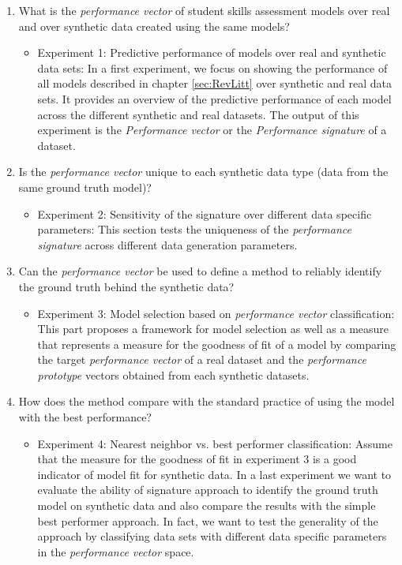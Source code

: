 \begin{enumerate}
\item What is the \textit{performance vector} of student skills assessment models over real and over synthetic data created using the same models?
\begin{itemize}
\item Experiment 1: Predictive performance of models over real and synthetic data sets: In a first experiment, we focus on showing the performance of all models described in chapter \ref{sec:RevLitt} over synthetic and real data sets. It provides an overview of the predictive performance of each model across the different synthetic and real datasets. The output of this experiment is the \textit{Performance vector} or the \textit{Performance signature} of a dataset.
\end{itemize}
\item Is the \textit{performance vector} unique to each synthetic data type (data from the same ground truth model)?
\begin{itemize}
\item Experiment 2: Sensitivity of the signature over different data specific parameters: This section tests the uniqueness of the \textit{performance signature} across different data generation parameters.
\end{itemize}
\item Can the \textit{performance vector} be used to define a method to reliably identify the ground truth behind the synthetic data?
\begin{itemize}
\item Experiment 3: Model selection based on \textit{performance vector} classification: This part proposes a framework for model selection as well as a measure that represents a measure for the goodness of fit of a model by comparing the target \textit{performance vector} of a real dataset and the \textit{performance prototype} vectors obtained from each synthetic datasets.
\end{itemize}
\item How does the method compare with the standard practice of using the model with the best performance?
\begin{itemize}

\item Experiment 4: Nearest neighbor vs. best performer classification: Assume that the measure for the goodness of fit in experiment 3 is a good indicator of model fit for synthetic data. In a last experiment we want to evaluate the ability of signature approach to identify the ground truth model on synthetic data and also compare the results with the simple best performer approach. In fact, we want to test the generality of the approach by classifying data sets with different data specific parameters in the \textit{performance vector} space. 


\end{itemize}
\end{enumerate}
